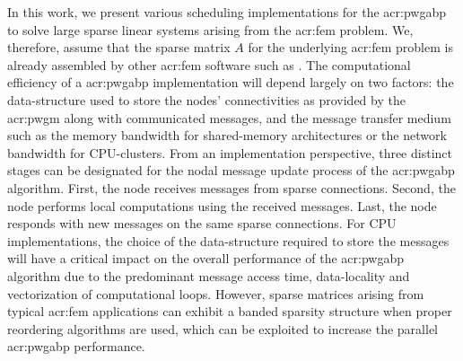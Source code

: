 In this work, we present various scheduling implementations for the \gls{acr:pwgabp} to solve large sparse linear systems arising from the \gls{acr:fem} problem.
We, therefore, assume that the sparse matrix $A$ for the underlying \gls{acr:fem} problem is already assembled by other \gls{acr:fem} software such as  \cite{bib:getfem}.
The computational efficiency of a \gls{acr:pwgabp} implementation will depend largely on two factors: the data-structure used to store the nodes' connectivities as provided by the \gls{acr:pwgm} along with communicated messages, and the message transfer medium such as the memory bandwidth for shared-memory architectures or the network bandwidth for CPU-clusters.
From an implementation perspective, three distinct stages can be designated for the nodal message update process of the \gls{acr:pwgabp} algorithm.
First, the node receives messages from sparse connections.
Second, the node performs local computations using the received messages.
Last, the node responds with new messages on the same sparse connections.
For CPU implementations, the choice of the data-structure required to store the messages will have a critical impact on the overall performance of the \gls{acr:pwgabp} algorithm due to the predominant message access time, data-locality and vectorization of computational loops.
However, sparse matrices arising from typical \gls{acr:fem} applications can exhibit a banded sparsity structure when proper reordering algorithms are used, which can be exploited to increase the parallel \gls{acr:pwgabp} performance.


